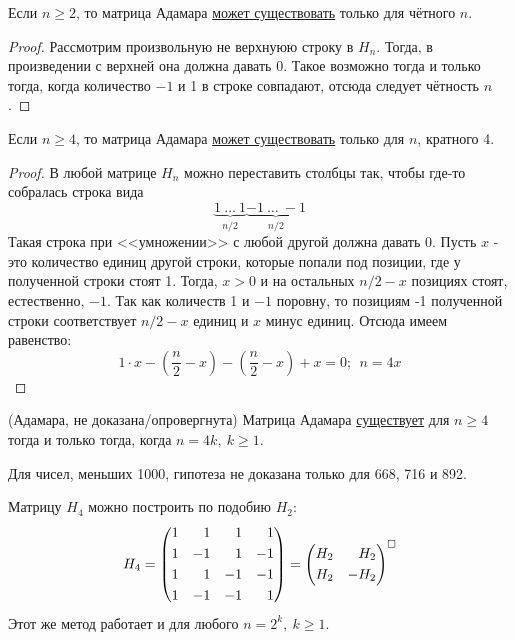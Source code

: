 \begin{proposition}
	Если $n \ge 2$, то матрица Адамара \underline{может существовать} только для чётного $n$.
\end{proposition}

\begin{proof}
	Рассмотрим произвольную не верхнуюю строку в $H_n$. Тогда, в произведении с верхней она должна давать 0. Такое возможно тогда и только тогда, когда количество $-1$ и 1 в строке совпадают, отсюда следует чётность $n$.
\end{proof}

\begin{proposition}
	Если $n \ge 4$, то матрица Адамара \underline{может существовать} только для $n$, кратного 4.
\end{proposition}

\begin{proof}
	В любой матрице $H_n$ можно переставить столбцы так, чтобы где-то собралась строка вида
	\[
		\underbrace{1\ \ldots\ 1}_{n/2} \underbrace{-1\ \ldots\ -1}_{n/2}
	\]
	Такая строка при <<умножении>> с любой другой должна давать 0. Пусть $x$ - это количество единиц другой строки, которые попали под позиции, где у полученной строки стоят 1. Тогда, $x > 0$ и на остальных $n/2 - x$ позициях стоят, естественно, $-1$. Так как количеств 1 и $-1$ поровну, то позициям -1 полученной строки соответствует $n/2 - x$ единиц и $x$ минус единиц. Отсюда имеем равенство:
	\[
		1 \cdot x - \left(\frac{n}{2} - x\right) - \left(\frac{n}{2} - x\right) + x = 0;\ \ n = 4x
	\]
\end{proof}

\begin{hypothesis} (Адамара, не доказана/опровергнута)
	Матрица Адамара \underline{существует} для $n \ge 4$ тогда и только тогда, когда $n = 4k,\ k \ge 1$.
\end{hypothesis}

\begin{note}
	 Для чисел, меньших 1000, гипотеза не доказана только для 668, 716 и 892.
\end{note}

\begin{example}
	Матрицу $H_4$ можно построить по подобию $H_2$:
	\[
		H_4 = \left(\begin{aligned}
			&1 &1& &1& &1 \\
			&1 &-1& &1& &-1 \\
			&1 &1& &-1& &-1 \\
			&1 &-1& &-1& &1
		\end{aligned}\right) = \left(\begin{aligned}
			&H_2 & H_2 \\
			&H_2 & -H_2
		\end{aligned}\right)^{\square}
	\]
	Этот же метод работает и для любого $n = 2^k,\ k \ge 1$.
\end{example}

